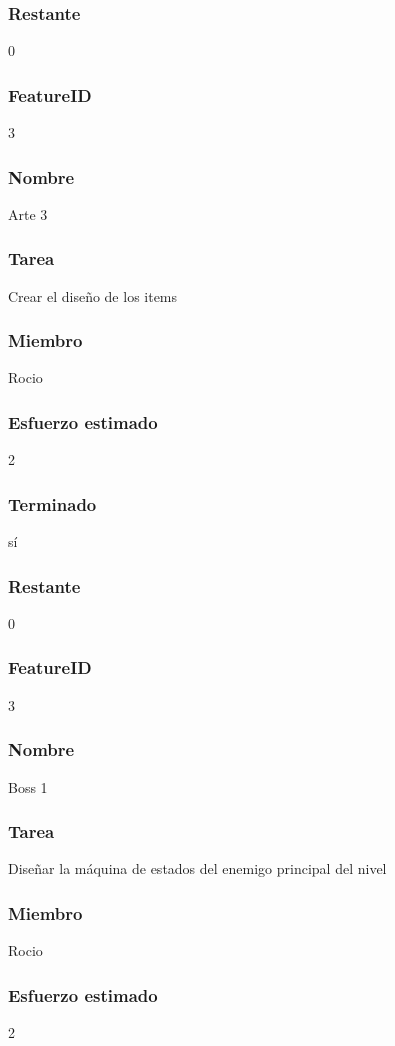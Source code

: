 \subsubsection{Restante} 0


\subsubsection{FeatureID} 3
\subsubsection{Nombre} Arte 3
\subsubsection{Tarea} Crear el diseño de los items
\subsubsection{Miembro} Rocio
\subsubsection{Esfuerzo estimado} 2
\subsubsection{Terminado} sí
\subsubsection{Restante} 0

\subsubsection{FeatureID} 3
\subsubsection{Nombre} Boss 1
\subsubsection{Tarea} Diseñar la máquina de estados del enemigo principal del nivel
\subsubsection{Miembro} Rocio
\subsubsection{Esfuerzo estimado} 2
